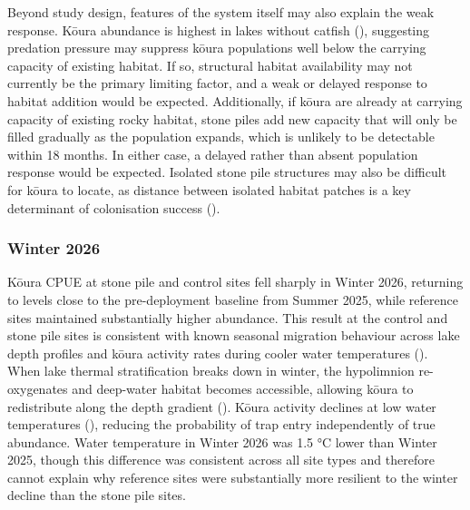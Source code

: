\documentclass[
  letterpaper,
  DIV=11,
  numbers=noendperiod]{scrartcl}
\begin{document}
Beyond study design, features of the system itself may also explain the
weak response. Kōura abundance is highest in lakes without catfish
(), suggesting predation
pressure may suppress kōura populations well below the carrying capacity
of existing habitat. If so, structural habitat availability may not
currently be the primary limiting factor, and a weak or delayed response
to habitat addition would be expected. Additionally, if kōura are
already at carrying capacity of existing rocky habitat, stone piles add
new capacity that will only be filled gradually as the population
expands, which is unlikely to be detectable within 18 months. In either
case, a delayed rather than absent population response would be
expected. Isolated stone pile structures may also be difficult for kōura
to locate, as distance between isolated habitat patches is a key
determinant of colonisation success ().

\subsubsection{Winter 2026}\label{winter-2026}

Kōura CPUE at stone pile and control sites fell sharply in Winter 2026,
returning to levels close to the pre-deployment baseline from Summer
2025, while reference sites maintained substantially higher abundance.
This result at the control and stone pile sites is consistent with known
seasonal migration behaviour across lake depth profiles and kōura
activity rates during cooler water temperatures
(). When lake thermal
stratification breaks down in winter, the hypolimnion re-oxygenates and
deep-water habitat becomes accessible, allowing kōura to redistribute
along the depth gradient ().
Kōura activity declines at low water temperatures
(), reducing the probability of
trap entry independently of true abundance. Water temperature in Winter
2026 was 1.5 °C lower than Winter 2025, though this difference was
consistent across all site types and therefore cannot explain why
reference sites were substantially more resilient to the winter decline
than the stone pile sites.
\end{document}
